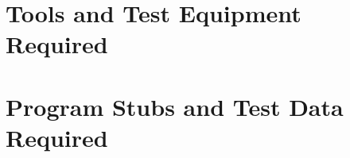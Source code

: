 \documentclass{article}
\begin{document}
\section{Tools and Test Equipment Required}
\section{Program Stubs and Test Data Required}
\end{document}
